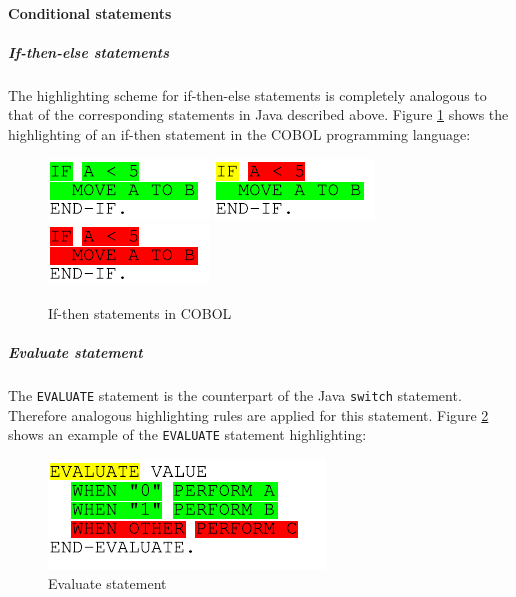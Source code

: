 \paragraph{Conditional statements}
\subparagraph{If-then-else statements}
The highlighting scheme for if-then-else statements is completely analogous to that of the corresponding statements in Java described above. Figure \ref{ui_fg:If-then statements in COBOL} shows the highlighting of an if-then statement in the COBOL programming language:
\begin{figure}[htp]
 \hfill
 \includegraphics[]{images/Source_Code_Highlighting/if_cobol/if_without_else_green}
 \hfill
 \includegraphics[]{images/Source_Code_Highlighting/if_cobol/if_without_else_yellow}
 \hfill
 \includegraphics[]{images/Source_Code_Highlighting/if_cobol/if_without_else_red}
 \hspace{1cm}
 \hfill
 \caption{If-then statements in COBOL}
 \label{ui_fg:If-then statements in COBOL}
\end{figure}
\par

\subparagraph{Evaluate statement}
The \texttt{EVALUATE} statement is the counterpart of the Java \texttt{switch} statement. Therefore analogous highlighting rules are applied for this statement. Figure \ref{ui_fg:Evaluate statement} shows an example of the \texttt{EVALUATE} statement highlighting:
\begin{figure}[htp]
 \centering
 \includegraphics[]{images/Source_Code_Highlighting/evaluate/evaluate}
 \caption{Evaluate statement}
 \label{ui_fg:Evaluate statement}
\end{figure}
\par

